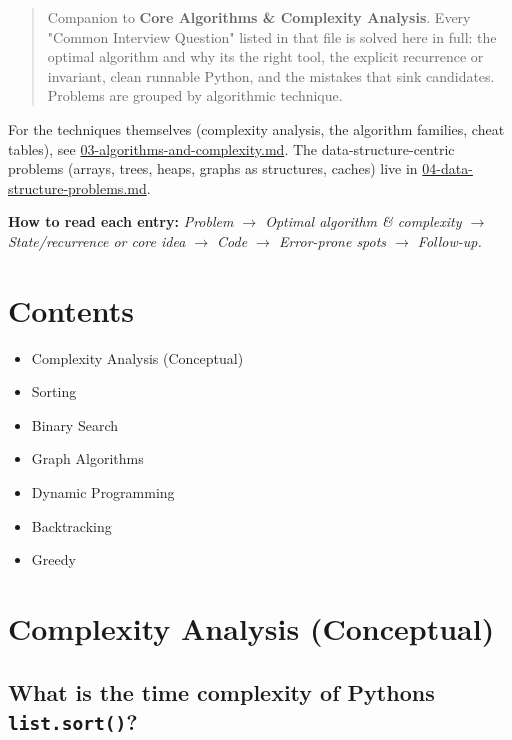 \documentclass[11pt]{article}
\providecommand{\tightlist}{\setlength{\itemsep}{1pt}\setlength{\parskip}{0pt}}
\begin{document}
\setlength{\parindent}{0pt}\setlength{\parskip}{0.45\baselineskip}

\makecoverpage

\thispagestyle{empty}
{\hypersetup{hidelinks}\tableofcontents}
\clearpage

\begin{quote}
Companion to \textbf{Core Algorithms \& Complexity Analysis}. Every "Common Interview Question" listed in that file is solved here in full: the optimal algorithm and why it\textquotesingle s the right tool, the explicit recurrence or invariant, clean runnable Python, and the mistakes that sink candidates. Problems are grouped by algorithmic technique.
\end{quote}

For the techniques themselves (complexity analysis, the algorithm families, cheat tables), see \url{03-algorithms-and-complexity.md}. The data-structure-centric problems (arrays, trees, heaps, graphs as structures, caches) live in \url{04-data-structure-problems.md}.

\textbf{How to read each entry:} \emph{Problem \(\rightarrow\) Optimal algorithm \& complexity \(\rightarrow\) State/recurrence or core idea \(\rightarrow\) Code \(\rightarrow\) Error-prone spots \(\rightarrow\) Follow-up.}

\section{Contents}\label{contents}

\begin{itemize}
\tightlist
\item
  Complexity Analysis (Conceptual)
\item
  Sorting
\item
  Binary Search
\item
  Graph Algorithms
\item
  Dynamic Programming
\item
  Backtracking
\item
  Greedy
\end{itemize}

\section{Complexity Analysis (Conceptual)}\label{complexity-analysis-conceptual}

\subsection{\texorpdfstring{What is the time complexity of Python\textquotesingle s \texttt{list.sort()}?}{What is the time complexity of Python\textquotesingle s list.sort()?}}\label{what-is-the-time-complexity-of-pythons-listsort}
\end{document}
